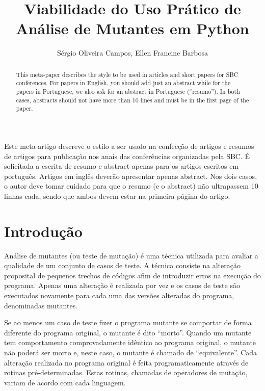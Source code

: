 \documentclass[12pt]{article}
\title{Viabilidade do Uso Prático de Análise de Mutantes em Python}
\author{Sérgio Oliveira Campos\inst{1}, Ellen Francine Barbosa\inst{1}}
\begin{document}
 

\maketitle

\begin{abstract}
  This meta-paper describes the style to be used in articles and short papers
  for SBC conferences. For papers in English, you should add just an abstract
  while for the papers in Portuguese, we also ask for an abstract in
  Portuguese (``resumo''). In both cases, abstracts should not have more than
  10 lines and must be in the first page of the paper.
\end{abstract}
     
\begin{resumo} 
  Este meta-artigo descreve o estilo a ser usado na confecção de artigos e
  resumos de artigos para publicação nos anais das conferências organizadas
  pela SBC. É solicitada a escrita de resumo e abstract apenas para os artigos
  escritos em português. Artigos em inglês deverão apresentar apenas abstract.
  Nos dois casos, o autor deve tomar cuidado para que o resumo (e o abstract)
  não ultrapassem 10 linhas cada, sendo que ambos devem estar na primeira
  página do artigo.
\end{resumo}


\section{Introdução}


Análise de mutantes (ou teste de mutação) \cite{DeMillo:1978} é uma técnica 
utilizada para avaliar a qualidade de um conjunto de casos de teste. 
A técnica consiste
na alteração proposital de pequenos trechos de códigos afim de introduzir erros na
execução do programa. Apenas uma alteração é realizada por vez e os casos
de teste são executados novamente para cada uma das versões alteradas do
programa, denominadas mutantes.

Se ao menos um caso de teste fizer o programa
mutante se comportar de forma diferente do programa original, o mutante é dito 
``morto''. Quando um mutante tem comportamento comprovadamente idêntico ao 
programa original, o mutante não poderá ser morto e, neste caso, o mutante é
chamado de ``equivalente''. Cada alteração realizada no programa original é 
feita programaticamente através de
rotinas pré-determinadas. Estas rotinas, chamadas de operadores de mutação, variam
de acordo com cada linguagem.
\end{document}
